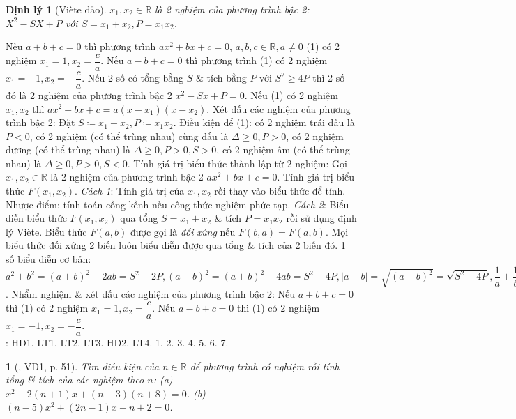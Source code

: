 \documentclass{article}
\newtheorem{baitoan}{}
\newtheorem{dinhly}{Định lý}
\begin{document}
\begin{dinhly}[Vi\`ete đảo]
	$x_1,x_2\in\mathbb{R}$ là 2 nghiệm của phương trình bậc 2: $X^2 - SX + P$ với $S = x_1 + x_2,P = x_1x_2$.
\end{dinhly}
\noindent{} Nếu $a + b + c = 0$ thì phương trình $ax^2 + bx + c = 0$, $a,b,c\in\mathbb{R},a\ne0$ (1) có 2 nghiệm $x_1 = 1,x_2 = \dfrac{c}{a}$. Nếu $a - b + c = 0$ thì phương trình (1) có 2 nghiệm $x_1 = -1,x_2 = -\dfrac{c}{a}$.  Nếu 2 số có tổng bằng $S$ \& tích bằng $P$ với $S^2\ge4P$ thì 2 số đó là 2 nghiệm của phương trình bậc 2 $x^2 - Sx + P = 0$.  Nếu (1) có 2 nghiệm $x_1,x_2$ thì $ax^2 + bx + c = a(x - x_1)(x - x_2)$.  {\sf Xét dấu các nghiệm của phương trình bậc 2}: Đặt $S\coloneqq x_1 + x_2,P\coloneqq x_1x_2$. Điều kiện để (1): có 2 nghiệm trái dấu là $P < 0$, có 2 nghiệm (có thể trùng nhau) cùng dấu là $\Delta\ge0,P > 0$, có 2 nghiệm dương (có thể trùng nhau) là $\Delta\ge0,P > 0,S > 0$, có 2 nghiệm âm (có thể trùng nhau) là $\Delta\ge0,P > 0,S < 0$.  {\sf Tính giá trị biểu thức thành lập từ 2 nghiệm}: Gọi $x_1,x_2\in\mathbb{R}$ là 2 nghiệm của phương trình bậc 2 $ax^2 + bx + c = 0$. Tính giá trị biểu thức $F(x_1,x_2)$. \textit{Cách 1}: Tính giá trị của $x_1,x_2$ rồi thay vào biểu thức để tính. Nhược điểm: tính toán cồng kềnh nếu công thức nghiệm phức tạp. \textit{Cách 2}: Biểu diễn biểu thức $F(x_1,x_2)$ qua tổng $S = x_1 + x_2$ \& tích $P = x_1x_2$ rồi sử dụng định lý Vi\`ete.  Biểu thức $F(a,b)$ được gọi là \textit{đối xứng} nếu $F(b,a) = F(a,b)$. Mọi biểu thức đối xứng 2 biến luôn biểu diễn được qua tổng \& tích của 2 biến đó. 1 số biểu diễn cơ bản: $a^2 + b^2 = (a + b)^2 - 2ab = S^2 - 2P,(a - b)^2 = (a + b)^2 - 4ab = S^2 - 4P,|a - b| = \sqrt{(a - b)^2} = \sqrt{S^2 - 4P},\dfrac{1}{a} + \dfrac{1}{b} = \dfrac{a + b}{ab} = \dfrac{S}{P},a^3 + b^3 = (a + b)^3 - 3ab(a + b) = S^3 - 3PS,a^4 + b^4 = (a^2 + b^2)^2 - 2a^2b^2 = (S^2 - 2P)^2 - 2P^2$.  {\sf Nhẩm nghiệm \& xét dấu các nghiệm của phương trình bậc 2}: Nếu $a + b + c = 0$ thì (1) có 2 nghiệm $x_1 = 1,x_2 = \dfrac{c}{a}$. Nếu $a - b + c = 0$ thì (1) có 2 nghiệm $x_1 = -1,x_2 = -\dfrac{c}{a}$.\\

\noindent\cite[Chap. VII, \S3, pp. 61--65]{SGK_Toan_9_Canh_Dieu_tap_2}: HD1. LT1. LT2. LT3. HD2. LT4. 1. 2. 3. 4. 5. 6. 7.

\begin{baitoan}[\cite{Binh_boi_duong_Toan_9_tap_2}, VD1, p. 51]
	Tìm điều kiện của $n\in\mathbb{R}$ để phương trình có nghiệm rồi tính tổng \& tích của các nghiệm theo $n$: (a) $x^2 - 2(n + 1)x + (n - 3)(n + 8) = 0$. (b) $(n - 5)x^2 + (2n - 1)x + n + 2 = 0$.
\end{baitoan}
\end{document}
